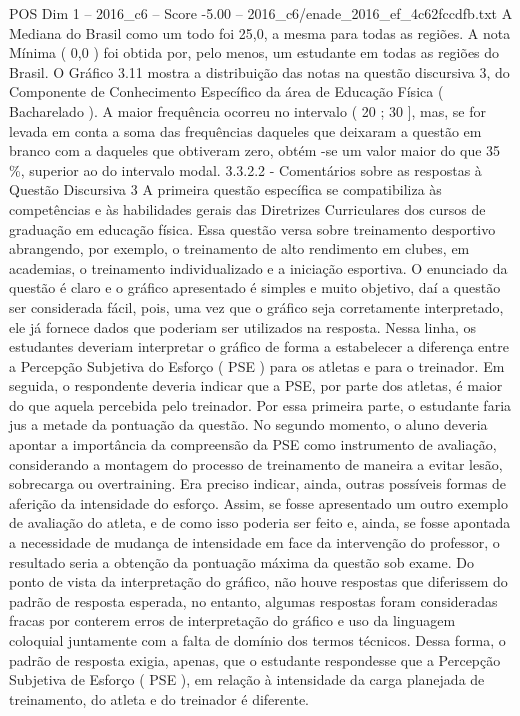 \begin{textsample}{POS Dim 1 – 2016\_c6 – Score -5.00 – 2016\_c6/enade\_2016\_ef\_4c62fccdfb.txt}
A Mediana do Brasil como um todo foi 25,0, a mesma para todas as regiões.
A nota Mínima ( 0,0 ) foi obtida por, pelo menos, um estudante em todas as regiões do Brasil.
O Gráfico 3.11 mostra a distribuição das notas na questão discursiva 3, do Componente de Conhecimento Específico da área de Educação Física ( Bacharelado ).
A maior frequência ocorreu no intervalo ( 20 ; 30 ], mas, se for levada em conta a soma das frequências daqueles que deixaram a questão em branco com a daqueles que obtiveram zero, obtém -se um valor maior do que 35 \%, superior ao do intervalo modal. 3.3.2.2 - Comentários sobre as respostas à Questão Discursiva 3 A primeira questão específica se compatibiliza às competências e às habilidades gerais das Diretrizes Curriculares dos cursos de graduação em educação física.
Essa questão versa sobre treinamento desportivo abrangendo, por exemplo, o treinamento de alto rendimento em clubes, em academias, o treinamento individualizado e a iniciação esportiva.
O enunciado da questão é claro e o gráfico apresentado é simples e muito objetivo, daí a questão ser considerada fácil, pois, uma vez que o gráfico seja corretamente interpretado, ele já fornece dados que poderiam ser utilizados na resposta.
Nessa linha, os estudantes deveriam interpretar o gráfico de forma a estabelecer a diferença entre a Percepção Subjetiva do Esforço ( PSE ) para os atletas e para o treinador.
Em seguida, o respondente deveria indicar que a PSE, por parte dos atletas, é maior do que aquela percebida pelo treinador.
Por essa primeira parte, o estudante faria jus a metade da pontuação da questão.
No segundo momento, o aluno deveria apontar a importância da compreensão da PSE como instrumento de avaliação, considerando a montagem do processo de treinamento de maneira a evitar lesão, sobrecarga ou overtraining.
Era preciso indicar, ainda, outras possíveis formas de aferição da intensidade do esforço.
Assim, se fosse apresentado um outro exemplo de avaliação do atleta, e de como isso poderia ser feito e, ainda, se fosse apontada a necessidade de mudança de intensidade em face da intervenção do professor, o resultado seria a obtenção da pontuação máxima da questão sob exame.
Do ponto de vista da interpretação do gráfico, não houve respostas que diferissem do padrão de resposta esperada, no entanto, algumas respostas foram consideradas fracas por conterem erros de interpretação do gráfico e uso da linguagem coloquial juntamente com a falta de domínio dos termos técnicos.
Dessa forma, o padrão de resposta exigia, apenas, que o estudante respondesse que a Percepção Subjetiva de Esforço ( PSE ), em relação à intensidade da carga planejada de treinamento, do atleta e do treinador é diferente.

\end{textsample}
